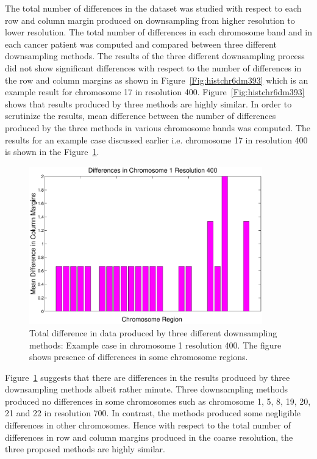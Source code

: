 The total number of differences in the dataset was studied with respect to each row and column margin produced on downsampling from higher resolution to lower resolution. The total number of differences in each chromosome band and in each cancer patient was computed and compared between three different downsampling methods. The results of the three different downsampling process did not show significant differences with respect to the number of differences in the row and column margins as shown in Figure~\ref{Fig:histchr6dm393} which is an example result for chromosome 17 in resolution 400. Figure~\ref{Fig:histchr6dm393} shows that results produced by three methods are highly similar. In order to scrutinize the results, mean difference between the number of differences produced by the three methods in various chromosome bands was computed. The results for an example case discussed earlier i.e. chromosome 17 in resolution 400 is shown in the Figure~\ref{Fig:diffchr6dm393}. 


\begin{figure}[h!]
\centering
\includegraphics[width=0.9\textwidth]{figures/meanColumnMardiffChr1}
\caption[Mean of differences in aberrations in each column]{Total difference in data produced by three different downsampling methods: Example case in chromosome 1 resolution 400. The figure shows presence of  differences in some chromosome regions.}\label{Fig:diffchr6dm393}
\end{figure}


Figure~\ref{Fig:diffchr6dm393} suggests that there are differences in the results produced by three downsampling methods albeit rather minute. Three downsampling methods produced no differences in some chromosomes such as chromosome 1, 5, 8, 19, 20, 21 and 22 in resolution 700. In contrast, the methods produced some negligible differences in other chromosomes. Hence with respect to the total number of differences in row and column margins produced in the coarse resolution, the three proposed methods are highly similar.


